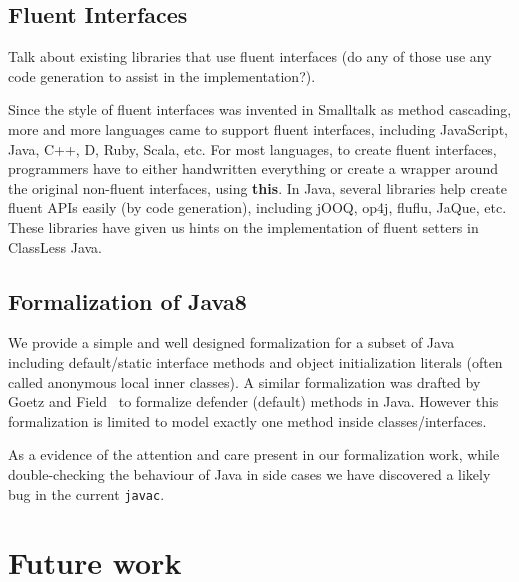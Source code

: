 \subsection{Fluent Interfaces}
Talk about existing libraries that use fluent interfaces (do any of
those use any code generation to assist in the implementation?).

Since the style of fluent interfaces was invented in Smalltalk as method
cascading, more and more languages came to support fluent interfaces, including
JavaScript, Java, C++, D, Ruby, Scala, etc. For most languages, to create fluent
interfaces, programmers have to either handwritten everything or create a
wrapper around the original non-fluent interfaces, using \textbf{this}. In Java,
several libraries help create fluent APIs easily (by code generation), including
jOOQ, op4j, fluflu, JaQue, etc. These libraries have given us hints on the
implementation of fluent setters in ClassLess Java.

\subsection{Formalization of Java8}
We provide a simple and well designed formalization for a subset of Java including default/static interface methods and object initialization literals (often called anonymous local inner classes).
A similar formalization was drafted by
Goetz and Field~\cite{goetz12fdefenders} to formalize defender (default) methods
in Java. However this formalization is limited to model exactly one
method inside classes/interfaces.

As a evidence of the attention and care present in our formalization work, while double-checking the behaviour of Java in side cases we have discovered a likely bug in the current \texttt{javac}.

\section{Future work}

